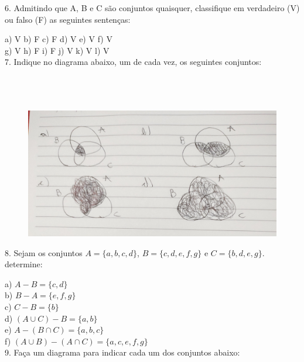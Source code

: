 \documentclass[12pt]{article}
\begin{document}
  	6. Admitindo que A, B e C são conjuntos quaisquer, classifique em verdadeiro (V) ou falso (F) as seguintes sentenças:
  	\vspace{12pt}
  	
  	\noindent a) V \quad b) F \quad c) F \quad d) V \quad e) V \quad f) V\\
  	g) V \quad h) F \quad i) F \quad j) V \quad k) V \quad l) V\\
  	
  	7. Indique no diagrama abaixo, um de cada vez, os seguintes conjuntos:\\\\\\\\
  	\vspace{12pt}
  	
  	\begin{figure}[h!]
  		\includegraphics[scale=0.2]{q7}
  	\end{figure}
  
  	8. Sejam os conjuntos $A = \{a, b, c, d\}$, $B = \{c, d, e, f, g\}$ e $C = \{b, d, e, g\}$. determine:
  	\vspace{12pt}
  	
  	\noindent a) $A-B = \{c,d\}$\\
  	b) $B-A = \{e,f,g\}$\\
  	c) $C-B = \{b\}$\\
  	d) $(A \cup C)-B = \{a,b\}$\\
  	e) $A-(B \cap C) = \{a,b,c\}$\\
  	f) $(A \cup B)-(A \cap C) = \{a,c,e,f,g\}$\\
  	
  	9. Faça um diagrama para indicar cada um dos conjuntos abaixo:\\\\\\\\\\\\\\\\\\\\\\\\\\\\
  	\vspace{12pt}
  	
\end{document}
